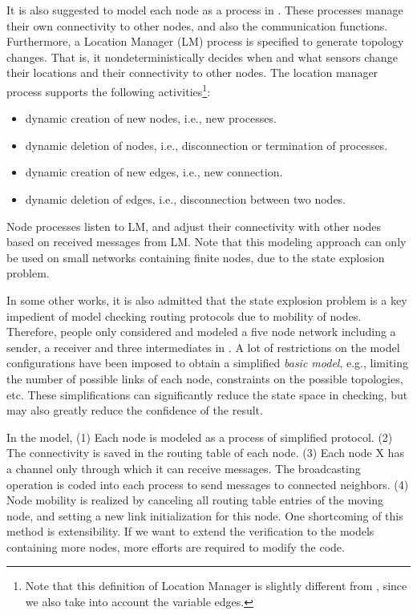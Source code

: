 \documentclass[a4paper,10pt,twocolumn]{article}
\begin{document}
It is also suggested to model each node as a process in \cite{Ole05}. These processes manage their own connectivity to other nodes, and also the communication functions. Furthermore, a Location Manager (LM) process is specified to generate topology changes. That is, it nondeterministically decides when and what sensors change their locations and their connectivity to other nodes. The location manager process supports the following activities\footnote{Note that this definition of Location Manager is slightly different from \cite{Ole05}, since we also take into account the variable edges.}:
\begin{itemize}
  \item dynamic creation of new nodes, i.e., new processes.
  \item dynamic deletion of nodes, i.e., disconnection or termination of processes.
  \item dynamic creation of new edges, i.e., new connection.
  \item dynamic deletion of edges, i.e., disconnection between two nodes.
\end{itemize}
Node processes listen to LM, and adjust their connectivity with other nodes based on received messages from LM. Note that this modeling approach can only be used on small networks containing finite nodes, due to the state explosion problem.

In some other works, it is also admitted that the state explosion problem is a key impedient of model checking routing protocols due to mobility of nodes. Therefore, people only considered and modeled a five node network including a sender, a receiver and three intermediates in \cite{RA04}. A lot of restrictions on the model configurations have been imposed to obtain a simplified \emph{basic model}, e.g., limiting the number of possible links of each node, constraints on the possible topologies, etc. These simplifications can significantly reduce the state space in checking, but may also greatly reduce the confidence of the result.

In the model, (1) Each node is modeled as a process of simplified protocol. (2) The connectivity is saved in the routing table of each node. (3) Each node X has a channel  only through which it can receive messages. The broadcasting operation is coded into each process to send messages to connected neighbors. (4) Node mobility is realized by canceling all routing table entries of the moving node, and setting a new link initialization for this node. One shortcoming of this method is extensibility. If we want to extend the verification to the models containing more nodes, more efforts are required to modify the code.
\end{document}
